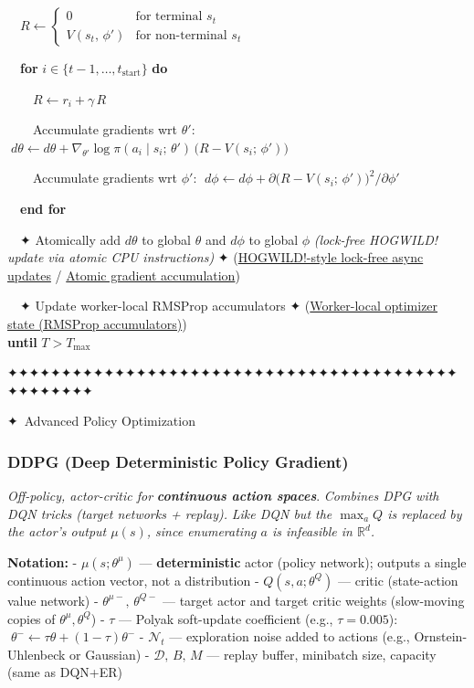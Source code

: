 \documentclass[11pt]{article}
\begin{document}
\begin{pseudobox}
\strut ~~\(R \leftarrow \begin{cases} 0 & \text{for terminal } s_t \\ V(s_t,\, \phi') & \text{for non-terminal } s_t \end{cases}\)\\
\strut ~~\textbf{for} \(i \in \{t - 1, \ldots, t_{\text{start}}\}\)
\textbf{do}\\
\strut ~~~~\(R \leftarrow r_i + \gamma\, R\)\\
\strut ~~~~Accumulate gradients wrt \(\theta'\):
\(\;d\theta \leftarrow d\theta + \nabla_{\theta'} \log \pi(a_i \mid s_i;\, \theta')\,\bigl(R - V(s_i;\, \phi')\bigr)\)\\
\strut ~~~~Accumulate gradients wrt \(\phi'\):
\(\;d\phi \leftarrow d\phi + \partial\bigl(R - V(s_i;\, \phi')\bigr)^{2} / \partial \phi'\)\\
\strut ~~\textbf{end for}\\
\strut ~~✦ Atomically add \(d\theta\) to global \(\theta\) and \(d\phi\)
to global \(\phi\) \emph{(lock-free HOGWILD! update via atomic CPU
instructions)} ✦ (\hyperref[trick-4-4-1]{HOGWILD!-style lock-free async
updates} / \hyperref[trick-4-4-5]{Atomic gradient accumulation})\\
\strut ~~✦ Update worker-local RMSProp accumulators ✦
(\hyperref[trick-4-4-2]{Worker-local optimizer state (RMSProp
accumulators)})\\
\textbf{until} \(T > T_{\max}\)

\end{pseudobox}

    ✦✦✦✦✦✦✦✦✦✦✦✦✦✦✦✦✦✦✦✦✦✦✦✦✦✦✦✦✦✦✦✦✦✦✦✦✦✦✦✦✦✦✦✦✦✦✦✦✦✦

    {✦ Advanced Policy Optimization}

    \clearpage

\label{ddpg}

    \subsubsection{DDPG (Deep Deterministic Policy
Gradient)}\label{ddpg-deep-deterministic-policy-gradient}

    \emph{Off-policy, actor-critic for} \textbf{\emph{continuous action
spaces}}. \emph{Combines DPG with DQN tricks (target networks +
replay).} \emph{Like DQN but the \(\max_a Q\) is replaced by the actor's
output \(\mu(s)\), since enumerating \(a\) is infeasible in
\(\mathbb{R}^d\).}

    \textbf{Notation:} - \(\mu(s;\theta^\mu)\) --- \textbf{deterministic}
actor (policy network); outputs a single continuous action vector, not a
distribution - \(Q(s,a;\theta^Q)\) --- critic (state-action value
network) - \(\theta^{\mu-},\,\theta^{Q-}\) --- target actor and target
critic weights (slow-moving copies of \(\theta^\mu, \theta^Q\)) -
\(\tau\) --- Polyak soft-update coefficient (e.g., \(\tau = 0.005\)):
\(\;\theta^- \leftarrow \tau\theta + (1-\tau)\theta^-\) -
\(\mathcal{N}_t\) --- exploration noise added to actions (e.g.,
Ornstein-Uhlenbeck or Gaussian) - \(\mathcal{D},\,B,\,M\) --- replay
buffer, minibatch size, capacity (same as DQN+ER)
\end{document}
